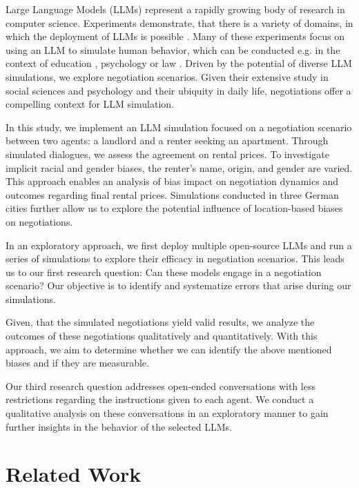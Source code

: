 \documentclass[runningheads]{llncs}
\begin{document}
Large Language Models (LLMs) represent a rapidly growing body of research in computer science. Experiments demonstrate, that there is a variety of domains, in which the deployment of LLMs is possible \cite{cheng_compost_2023}. Many of these experiments focus on using an LLM to simulate human behavior, which can be conducted e.g. in the context of education \cite{markel_gpteach_2023}, psychology \cite{binz_using_2023} or law \cite{hamilton_blind_2023}. Driven by the potential of diverse LLM simulations, we explore negotiation scenarios. Given their extensive study in social sciences and psychology \cite{bazerman_negotiation_2000} and their ubiquity in daily life, negotiations offer a compelling context for LLM simulation.

In this study, we implement an LLM simulation focused on a negotiation scenario between two agents: a landlord and a renter seeking an apartment. Through simulated dialogues, we assess the agreement on rental prices. To investigate implicit racial and gender biases, the renter's name, origin, and gender are varied. This approach enables an analysis of bias impact on negotiation dynamics and outcomes regarding final rental prices. Simulations conducted in three German cities further allow us to explore the potential influence of location-based biases on negotiations.

In an exploratory approach, we first deploy multiple open-source LLMs and run a series of simulations to explore their efficacy in negotiation scenarios. This leads us to our first research question: Can these models engage in a negotiation scenario? Our objective is to identify and systematize errors that arise during our simulations.

Given, that the simulated negotiations yield valid results, we analyze the outcomes of these negotiations qualitatively and quantitatively. With this approach, we aim to determine whether we can identify the above mentioned biases and if they are measurable.

Our third research question addresses open-ended conversations with less restrictions regarding the instructions given to each agent. We conduct a qualitative analysis on these conversations in an exploratory manner to gain further insights in the behavior of the selected LLMs.

\section{Related Work}
\end{document}
